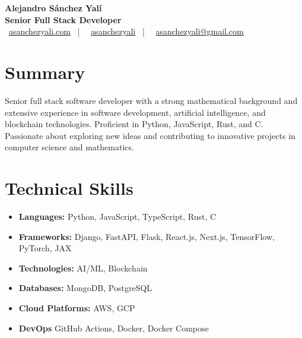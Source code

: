 \documentclass[letterpaper,11pt]{article}
\begin{document}
\begin{center}
\textbf{\Huge Alejandro Sánchez Yalí}\\[0.3em]
\textbf{\Large Senior Full Stack Developer}\\[0.5em]
\small
\faGlobe\ \href{https://asanchezyali.com}{asanchezyali.com} ~|~
\faLinkedin\ \href{https://www.linkedin.com/in/asanchezyali}{asanchezyali} ~|~
\faEnvelope\ \href{mailto:asanchezyali@gmail.com}{asanchezyali@gmail.com}
\end{center}

\section{Summary}
Senior full stack software developer with a strong mathematical background and extensive experience in software development, artificial intelligence, and blockchain technologies. Proficient in Python, JavaScript, Rust, and C. Passionate about exploring new ideas and contributing to innovative projects in computer science and mathematics.

\section{Technical Skills}
\begin{itemize}[leftmargin=*]
  \item \textbf{Languages:} Python, JavaScript, TypeScript, Rust, C
  \item \textbf{Frameworks:} Django, FastAPI, Flask, React.js, Next.js, TensorFlow, PyTorch, JAX
  \item \textbf{Technologies:} AI/ML, Blockchain
  \item \textbf{Databases:} MongoDB, PostgreSQL
  \item \textbf{Cloud Platforms:} AWS, GCP
  \item \textbf{DevOps} GitHub Actions, Docker, Docker Compose
\end{itemize}
\end{document}
